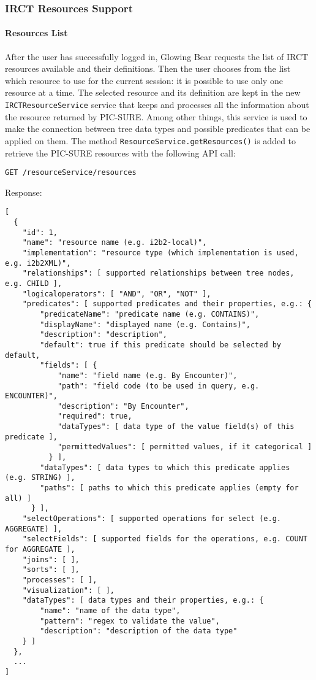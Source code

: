 \subsubsection{IRCT Resources Support}

\paragraph{Resources List}
After the user has successfully logged in, Glowing Bear requests the list of IRCT resources available and their definitions.
Then the user chooses from the list which resource to use for the current session: it is possible to use only one resource at a time. %
The selected resource and its definition are kept in the new \verb|IRCTResourceService| service that keeps and processes all the information about the resource returned by PIC-SURE.
Among other things, this service is used to make the connection between tree data types and possible predicates that can be applied on them.
The method \verb|ResourceService.getResources()| is added to retrieve the PIC-SURE resources with the following API call:

\newpage
\begin{verbatim}
GET /resourceService/resources
\end{verbatim}

Response:
\begin{verbatim}
[
  {
    "id": 1,
    "name": "resource name (e.g. i2b2-local)",
    "implementation": "resource type (which implementation is used, e.g. i2b2XML)",
    "relationships": [ supported relationships between tree nodes, e.g. CHILD ],
    "logicaloperators": [ "AND", "OR", "NOT" ],
    "predicates": [ supported predicates and their properties, e.g.: {
        "predicateName": "predicate name (e.g. CONTAINS)",
        "displayName": "displayed name (e.g. Contains)",
        "description": "description",
        "default": true if this predicate should be selected by default,
        "fields": [ {
            "name": "field name (e.g. By Encounter)",
            "path": "field code (to be used in query, e.g. ENCOUNTER)",
            "description": "By Encounter",
            "required": true,
            "dataTypes": [ data type of the value field(s) of this predicate ],
            "permittedValues": [ permitted values, if it categorical ]
          } ],
        "dataTypes": [ data types to which this predicate applies (e.g. STRING) ],
        "paths": [ paths to which this predicate applies (empty for all) ]
      } ],
    "selectOperations": [ supported operations for select (e.g. AGGREGATE) ],
    "selectFields": [ supported fields for the operations, e.g. COUNT for AGGREGATE ],
    "joins": [ ],
    "sorts": [ ],
    "processes": [ ],
    "visualization": [ ],
    "dataTypes": [ data types and their properties, e.g.: {
        "name": "name of the data type",
        "pattern": "regex to validate the value",
        "description": "description of the data type"
    } ]
  },
  ...
]
\end{verbatim}


